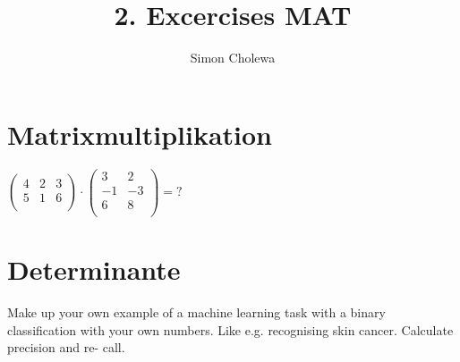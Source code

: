 \documentclass[11pt,a4paper]{article}
\title{}
\author{}
\begin{document}
\author{Simon Cholewa}
\title{2. Excercises MAT}

\maketitle

\section{Matrixmultiplikation}
$
\left( 
	\begin{array}{rrr}
		4 & 2 & 3 \\
		5 & 1 & 6 \\
	\end{array}
 \right)
 \cdot
 \left(
	\begin{array}{rr}
		3 & 2 \\
		-1 & -3 \\
		6 & 8\\
	\end{array}
\right)
=
?
$

\section{Determinante}
Make up your own example of a machine learning task with a binary classification
with your own numbers. Like e.g. recognising skin cancer. Calculate precision and re-
call.
\end{document}

